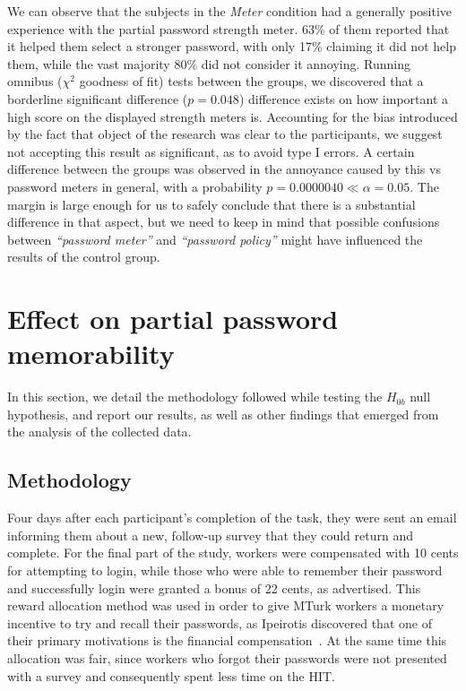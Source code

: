     We can observe that the subjects in the \emph{Meter} condition had a generally positive experience with the partial password strength meter. 63\% of them reported that it helped them select a stronger password, with only 17\% claiming it did not help them, while the vast majority 80\% did not consider it annoying. Running omnibus ($\chi^2$ goodness of fit) tests between the groups, we discovered that a borderline significant difference ($p=0.048$) difference exists on how important a high score on the displayed strength meters is. Accounting for the bias introduced by the fact that object of the research was clear to the participants, we suggest not accepting this result as significant, as to avoid type I errors. A certain difference between the groups was observed in the annoyance caused by this vs password meters in general, with a probability $p=0.0000040 \ll \alpha = 0.05$. The margin is large enough for us to safely conclude that there is a substantial difference in that aspect, but we need to keep in mind that possible confusions between \emph{``password meter''} and \emph{``password policy''} might have influenced the results of the control group.


\section{Effect on partial password memorability}
  \label{sec:memorability}
  In this section, we detail the methodology followed while testing the $H_{0b}$ null hypothesis, and report our results, as well as other findings that emerged from the analysis of the collected data.

  \subsection{Methodology}
    \label{ssec:memorability_setup}
    Four days after each participant's completion of the task, they were sent an email informing them about a new, follow-up survey that they could return and complete. For the final part of the study, workers were compensated with 10 cents for attempting to login, while those who were able to remember their password and successfully login were granted a bonus of 22 cents, as advertised. This reward allocation method was used in order to give MTurk workers a monetary incentive to try and recall their passwords, as Ipeirotis discovered that one of their primary motivations is the financial compensation~\cite{mturk_demographic}. At the same time this allocation was fair, since workers who forgot their passwords were not presented with a survey and consequently spent less time on the HIT.

